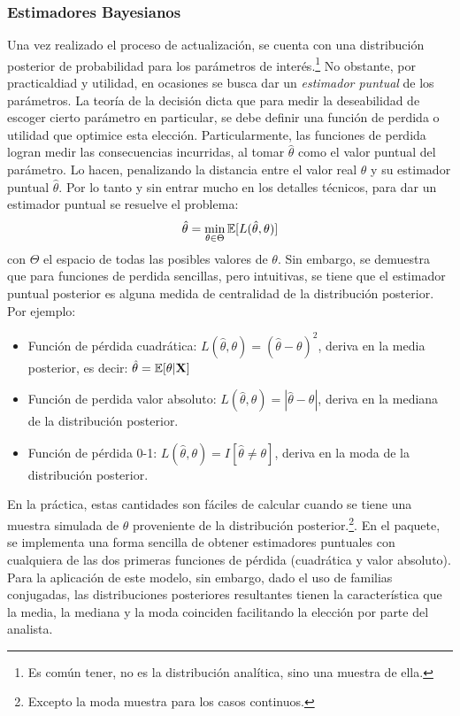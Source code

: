 \documentclass[../Main/Main.tex]{subfiles}
\begin{document}
\subsubsection{Estimadores Bayesianos}
Una vez realizado el proceso de actualización, se cuenta con una distribución posterior de probabilidad para los parámetros de interés.\footnote{Es común tener, no es la distribución analítica, sino una muestra de ella.} No obstante, por practicaldiad y utilidad, en ocasiones se busca dar un \textit{estimador puntual} de los parámetros. La teoría de la decisión dicta que para medir la deseabilidad de escoger cierto parámetro en particular, se debe definir una función de perdida o utilidad que optimice esta elección. Particularmente, las funciones de perdida logran medir las consecuencias incurridas, al tomar $\hat{\theta}$ como el valor puntual del parámetro. Lo hacen, penalizando la distancia entre el valor real $\theta$ y su estimador puntual $\hat{\theta}$. Por lo tanto y sin entrar mucho en los detalles técnicos, para dar un estimador puntual se resuelve el problema: 
\begin{align}
\hat{\theta} = \min_{\theta \in{\Theta}}\mathbb{E}[L(\hat{\theta},\theta)]
\end{align}
con $\Theta$ el espacio de todas las posibles valores de $\theta$. Sin embargo, se demuestra que para funciones de perdida sencillas, pero intuitivas, se tiene que el estimador puntual posterior es alguna medida de centralidad de la distribución posterior. Por ejemplo:
\begin{itemize}[label={}]
	\item Función de pérdida cuadrática: $L(\hat{\theta},\theta) = (\hat{\theta}-\theta)^2$, deriva en la media posterior, es decir: $\hat{\theta} = \mathbb{E}[\theta|\mathbf{X}]$ 
	\item Función de perdida valor absoluto: $L(\hat{\theta},\theta) = |\hat{\theta}-\theta|$, deriva en la mediana de la distribución posterior.
	\item Función de pérdida 0-1:  $L(\hat{\theta},\theta) = I[\hat{\theta} \neq \theta]$, deriva en la moda de la distribución posterior. 
\end{itemize}
En la práctica, estas cantidades son fáciles de calcular cuando se tiene una muestra simulada de $\theta$ proveniente de la distribución posterior.\footnote{Excepto la moda muestra para los casos continuos.}. En el paquete, se implementa una forma sencilla de obtener estimadores puntuales con cualquiera de las dos primeras funciones de pérdida (cuadrática y valor absoluto). Para la aplicación de este modelo, sin embargo, dado el uso de familias conjugadas, las distribuciones posteriores resultantes tienen la característica que la media, la mediana y la moda coinciden facilitando la elección por parte del analista.
\end{document}

